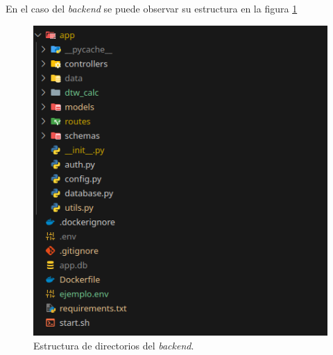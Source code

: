 En el caso del \textit{backend} se puede observar su estructura en la figura \ref{fig:estructurabackend}
\begin{figure}
	\centering
	\includegraphics[width=0.7\linewidth]{img/EstructuraDeDirectorios/EstructuraBackend}
	\caption{Estructura de directorios del \textit{backend}.}
	\label{fig:estructurabackend}
\end{figure}



